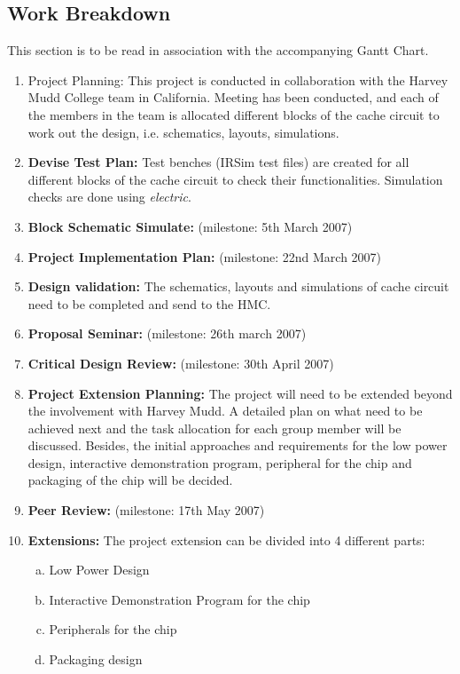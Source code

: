 \documentclass[a4paper,12pt]{article}
\begin{document}
\subsection{Work Breakdown}

This section is to be read in association with the accompanying Gantt
Chart.

\begin{enumerate}
\item Project Planning: This project is conducted in collaboration
with the Harvey Mudd College team in California. Meeting has been
conducted, and each of the members in the team is allocated different
blocks of the cache circuit to work out the design, i.e. schematics,
layouts, simulations.

\item \textbf{Devise Test Plan:} Test benches (IRSim test files) are created
for all different blocks of the cache circuit to check their
functionalities. Simulation checks are done using \emph{electric}.

\item \textbf{Block Schematic Simulate:} (milestone: 5th March 2007)

\item \textbf{Project Implementation Plan:} (milestone: 22nd March
2007)

\item \textbf{Design validation:} The schematics, layouts and
simulations of cache circuit need to be completed and send to the HMC.

\item \textbf{Proposal Seminar:} (milestone: 26th march 2007)

\item \textbf{Critical Design Review:} (milestone: 30th April 2007)

\item \textbf{Project Extension Planning:} The project will need to be
extended beyond the involvement with Harvey Mudd. A detailed plan on
what need to be achieved next and the task allocation for each group
member will be discussed. Besides, the initial approaches and
requirements for the low power design, interactive demonstration
program, peripheral for the chip and packaging of the chip will be
decided.

\item \textbf{Peer Review:} (milestone: 17th May 2007)

\item \textbf{Extensions:} The project extension can be divided into 4
different parts:
  \begin{enumerate}[a)]
    \item Low Power Design 
    \item Interactive Demonstration Program for the chip 
    \item Peripherals for the chip 
    \item Packaging design
  \end{enumerate}


\end{enumerate}
\end{document}
